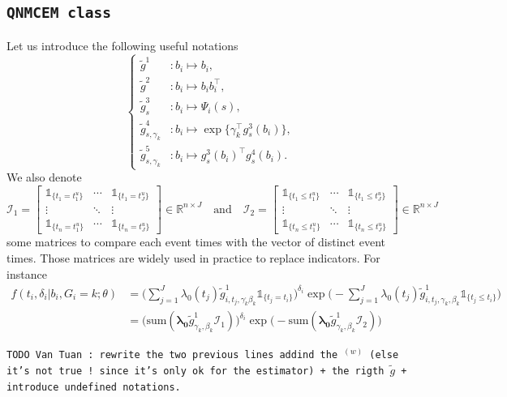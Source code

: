 \documentclass[11pt]{article}
\newcommand{\ind}[1]{\mathds{1}_{#1}}
\newcommand{\cI}{\mathcal I}
\newcommand{\R}{\mathds R}
\begin{document}
\subsection{\texttt{QNMCEM class}}
\label{sec:QNMCEM class}

Let us introduce the following useful notations
\begin{equation}
  \label{eq:g-tilde}
  \left\{
    \begin{array}{ll}
    \tilde g^1&: b_i \mapsto b_i,\\
    \tilde g^2&: b_i \mapsto b_ib_i^\top, \\
    \tilde g^3_{s}&: b_i \mapsto \Psi_i(s), \\
    \tilde g^4_{s, \gamma_k}&: b_i \mapsto \exp \big\{\gamma_k^\top g^3_{s}(b_i) \big\}, \\
    \tilde g^5_{s, \gamma_k}&: b_i \mapsto g^3_{s}(b_i)^\top g^4_{s}(b_i).
    \end{array}
  \right. 
\end{equation}
We also denote 
\[ \cI_1 = 
\begin{bmatrix}
  \ind{\{t_{1} = t_1^u\}}  & \cdots & \ind{\{t_{1} = t_J^u\}}\\
  \vdots &  \ddots & \vdots \\
  \ind{\{t_{n} = t_1^u\}} & \cdots & \ind{\{t_{n} = t_J^u\}}
\end{bmatrix}
\in \R^{n \times J}
\quad \text{and} \quad 
\cI_2 = 
\begin{bmatrix}
  \ind{\{t_{1} \leq t_1^u\}} & \cdots & \ind{\{t_{1} \leq t_J^u\}}\\
  \vdots &  \ddots & \vdots \\
  \ind{\{t_{n} \leq t_1^u\}} & \cdots & \ind{\{t_{n} \leq t_J^u\}}
\end{bmatrix}
\in \R^{n \times J} \]
some matrices to compare each event times with the vector of distinct event times. Those matrices are widely used in practice to replace indicators. For instance
\begin{align*}
f(t_i, \delta_i| b_i, G_i = k ; \theta) &= \Big( \sum_{j=1}^J \lambda_0(t_j) \tilde g_{i, t_j, \gamma_k^, \beta_k}^1 \ind{\{t_j = t_i\}} \Big)^{\delta_i} \exp \Big( - \sum_{j=1}^J \lambda_0(t_j) \tilde g_{i, t_j, \gamma_k, \beta_k}^1 \ind{\{t_j \leq t_i\}} \Big) \\
& = \Big( \text{sum}(\mathbf{\lambda_0} \tilde g_{\gamma_k, \beta_k}^1 \cI_1) \Big)^{\delta_i} \exp \Big( - \text{sum} (\mathbf{\lambda_0} \tilde g_{\gamma_k, \beta_k}^1\cI_2) \Big)
\end{align*}

\texttt{TODO Van Tuan : rewrite the two previous lines addind the $^{(w)}$ (else it's not true ! since it's only ok for the estimator) + the rigth $\tilde g$ + introduce undefined notations.}



{}
\end{document}
